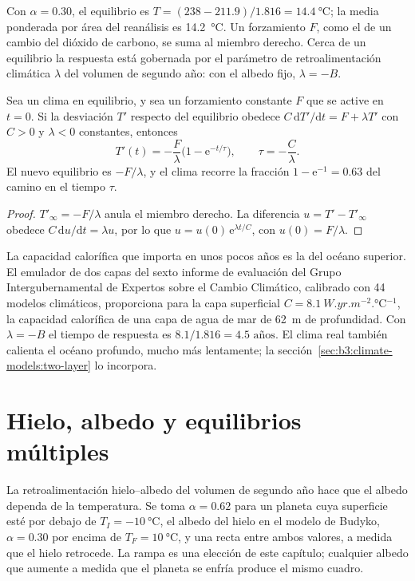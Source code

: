 Con $\alpha = 0.30$, el equilibrio es $T = (238 - 211.9)/1.816 =
\qty{14.4}{\celsius}$; la media ponderada por área del reanálisis es
\qty{14.2}{\celsius}. Un forzamiento $F$, como el de un cambio del
dióxido de carbono, se suma al miembro derecho. Cerca de un equilibrio la respuesta está
gobernada por el parámetro de retroalimentación climática $\lambda$ del volumen de segundo año:
con el albedo fijo, $\lambda = -B$.

\begin{theorem}\label{thm:b3:climate-models:response}
Sea un clima en equilibrio, y sea un forzamiento constante $F$ que se active
en $t = 0$. Si la desviación $T'$ respecto del equilibrio obedece $C\,\mathrm
dT'/\mathrm dt = F + \lambda T'$ con $C > 0$ y $\lambda < 0$ constantes,
entonces
\[
T'(t) = -\frac{F}{\lambda}\Big(1 - \mathrm e^{-t/\tau}\Big), \qquad
\tau = -\frac{C}{\lambda} .
\]
El nuevo equilibrio es $-F/\lambda$, y el clima recorre la fracción $1
- \mathrm e^{-1} = \num{0.63}$ del camino en el tiempo $\tau$.
\end{theorem}

\begin{proof}
$T'_\infty = -F/\lambda$ anula el miembro derecho. La diferencia
$u = T' - T'_\infty$ obedece $C\,\mathrm du/\mathrm dt = \lambda u$, por lo que $u =
u(0)\,\mathrm e^{\lambda t/C}$, con $u(0) = F/\lambda$.
\end{proof}

La capacidad calorífica que importa en unos pocos años es la del océano superior.
El emulador de dos capas del sexto informe de evaluación del
Grupo Intergubernamental de Expertos sobre el Cambio Climático, calibrado con 44 modelos climáticos,
proporciona para la capa superficial $C = \qty{8.1}{W.yr.m^{-2}.\celsius^{-1}}$, la
capacidad calorífica de una capa de agua de mar de \qty{62}{m} de profundidad. Con $\lambda = -B$ el
tiempo de respuesta es $8.1/1.816 = \num{4.5}\text{ años}$. El clima real también calienta
el océano profundo, mucho más lentamente; la sección~\ref{sec:b3:climate-models:two-layer}
lo incorpora.

\section{Hielo, albedo y equilibrios múltiples}\label{sec:b3:climate-models:multiple}

La retroalimentación hielo--albedo del volumen de segundo año hace que el albedo dependa de
la temperatura. Se toma $\alpha = 0.62$ para un planeta cuya superficie esté por debajo de
$T_I = \qty{-10}{\celsius}$, el albedo del hielo en el modelo de Budyko, $\alpha
= 0.30$ por encima de $T_F = \qty{+10}{\celsius}$, y una recta entre ambos valores, a medida que
el hielo retrocede. La rampa es una elección de este capítulo; cualquier albedo que
aumente a medida que el planeta se enfría produce el mismo cuadro.

